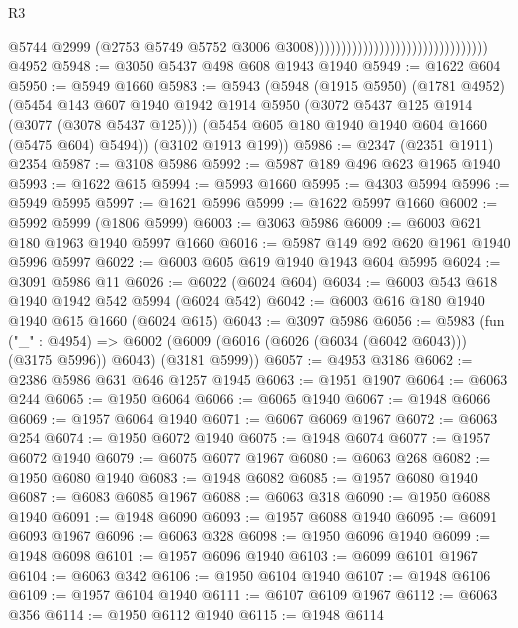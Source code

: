 \begin{lexlean}{R3}
\begin{coremodule}
                                                                  @5744
                                                                  @2999
                                                                  (@2753
                                                                    @5749
                                                                    @5752
                                                                    @3006
                                                                    @3008))))))))))))))))))))))))))))))))
    @4952
@5948 := @3050 @5437 @498 @608 @1943 @1940
@5949 := @1622 @604
@5950 := @5949 @1660
@5983 := @5943
    (@5948
      (@1915 @5950)
      (@1781 @4952)
      (@5454
        @143
        @607
        @1940
        @1942
        @1914
        @5950
        (@3072 @5437 @125 @1914 (@3077 (@3078 @5437 @125)))
        (@5454 @605 @180 @1940 @1940 @604 @1660 (@5475 @604) @5494))
      (@3102 @1913 @199))
@5986 := @2347 (@2351 @1911) @2354
@5987 := @3108 @5986
@5992 := @5987 @189 @496 @623 @1965 @1940
@5993 := @1622 @615
@5994 := @5993 @1660
@5995 := @4303 @5994
@5996 := @5949 @5995
@5997 := @1621 @5996
@5999 := @1622 @5997 @1660
@6002 := @5992 @5999 (@1806 @5999)
@6003 := @3063 @5986
@6009 := @6003 @621 @180 @1963 @1940 @5997 @1660
@6016 := @5987 @149 @92 @620 @1961 @1940 @5996 @5997
@6022 := @6003 @605 @619 @1940 @1943 @604 @5995
@6024 := @3091 @5986 @11
@6026 := @6022 (@6024 @604)
@6034 := @6003 @543 @618 @1940 @1942 @542 @5994 (@6024 @542)
@6042 := @6003 @616 @180 @1940 @1940 @615 @1660 (@6024 @615)
@6043 := @3097 @5986
@6056 := @5983
    (fun ("_" : @4954) =>
    @6002 (@6009 (@6016 (@6026 (@6034 (@6042 @6043))) (@3175 @5996)) @6043) (@3181 @5999))
@6057 := @4953 @3186
@6062 := @2386 @5986 @631 @646 @1257 @1945
@6063 := @1951 @1907
@6064 := @6063 @244
@6065 := @1950 @6064
@6066 := @6065 @1940
@6067 := @1948 @6066
@6069 := @1957 @6064 @1940
@6071 := @6067 @6069 @1967
@6072 := @6063 @254
@6074 := @1950 @6072 @1940
@6075 := @1948 @6074
@6077 := @1957 @6072 @1940
@6079 := @6075 @6077 @1967
@6080 := @6063 @268
@6082 := @1950 @6080 @1940
@6083 := @1948 @6082
@6085 := @1957 @6080 @1940
@6087 := @6083 @6085 @1967
@6088 := @6063 @318
@6090 := @1950 @6088 @1940
@6091 := @1948 @6090
@6093 := @1957 @6088 @1940
@6095 := @6091 @6093 @1967
@6096 := @6063 @328
@6098 := @1950 @6096 @1940
@6099 := @1948 @6098
@6101 := @1957 @6096 @1940
@6103 := @6099 @6101 @1967
@6104 := @6063 @342
@6106 := @1950 @6104 @1940
@6107 := @1948 @6106
@6109 := @1957 @6104 @1940
@6111 := @6107 @6109 @1967
@6112 := @6063 @356
@6114 := @1950 @6112 @1940
@6115 := @1948 @6114

\end{coremodule}
\end{lexlean}
